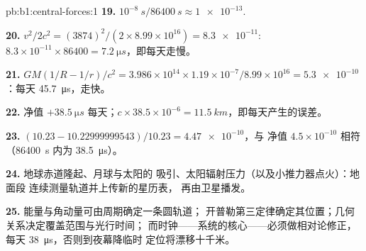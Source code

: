 \begin{solution}{pb:b1:central-forces:1}
\textbf{19.} $10^{-8}\ \unit{s}/\qty{86400}{s} \approx \num{1e-13}$.

\textbf{20.} $v^2/2c^2 = (3874)^2/(2 \times 8.99\times10^{16}) = \num{8.3e-11}$:
$8.3\times10^{-11} \times 86400 = \qty{7.2}{\micro s}$，即每天走慢。

\textbf{21.} $GM(1/R - 1/r)/c^2 = 3.986\times10^{14} \times 1.19\times10^{-7}/
8.99\times10^{16} = \num{5.3e-10}$：每天 \qty{45.7}{\micro s}，走快。

\textbf{22.} 净值 $+\qty{38.5}{\micro s}$ 每天；$c \times 38.5\times10^{-6}
= \qty{11.5}{km}$，即每天产生的误差。

\textbf{23.} $(10.23 - 10.22999999543)/10.23 = \num{4.47e-10}$，与
净值 $4.5\times10^{-10}$ 相符（\qty{86400}{s} 内为 \qty{38.5}{\micro s}）。

\textbf{24.} 地球赤道隆起、月球与太阳的
吸引、太阳辐射压力（以及小推力器点火）：地面段
连续测量轨道并上传新的星历表，
再由卫星播发。

\textbf{25.} 能量与角动量可由周期确定一条圆轨道；
开普勒第三定律确定其位置；几何关系决定覆盖范围与光行时间；
而时钟——系统的核心——必须做相对论修正，
每天 \qty{38}{\micro s}，否则到夜幕降临时
定位将漂移十千米。
\end{solution}
